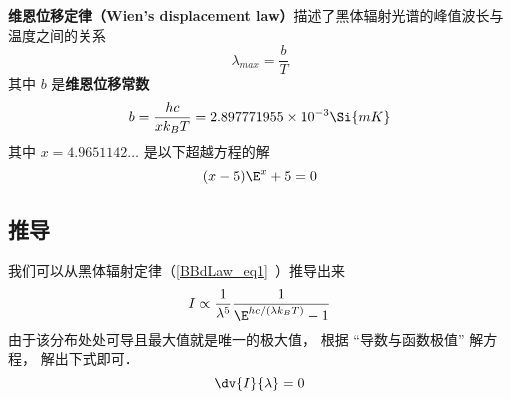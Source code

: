 
\textbf{维恩位移定律（Wien's displacement law）}描述了黑体辐射光谱的峰值波长与温度之间的关系
\begin{equation}
\lambda_{max} = \frac{b}{T}
\end{equation}
其中 $b$ 是\textbf{维恩位移常数}
\begin{equation}
b = \frac{hc}{xk_B T} = 2.897771955\times 10^{-3} \Si{mK}
\end{equation}
其中 $x = 4.9651142\dots$ 是以下超越方程的解
\begin{equation}
(x-5)\E^x + 5 = 0
\end{equation}

\subsection{推导}

我们可以从黑体辐射定律（\autoref{BBdLaw_eq1}~）推导出来
\begin{equation}
I \propto \frac{1}{\lambda^5} \frac{1}{\E^{hc/(\lambda k_B T)} - 1}
\end{equation}
由于该分布处处可导且最大值就是唯一的极大值， 根据 “导数与函数极值” 解方程， 解出下式即可．
\begin{equation}
\dv{I}{\lambda} = 0
\end{equation}

